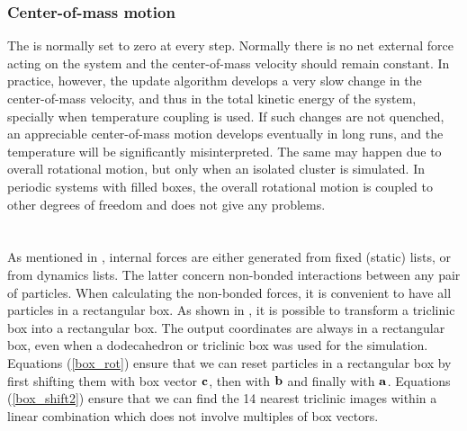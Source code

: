 \subsubsection*{Center-of-mass motion}
The  is normally set to zero at
every step.  Normally there is no net external force acting on the
system and the center-of-mass velocity should remain constant. In
practice, however, the update algorithm develops a very slow change in
the center-of-mass velocity, and thus in the total kinetic energy of
the system, specially when temperature coupling is used. If such
changes are not quenched, an appreciable center-of-mass motion
develops eventually in long runs, and the temperature will be
significantly misinterpreted. The same may happen due to overall
rotational motion, but only when an isolated cluster is simulated. In
periodic systems with filled boxes, the overall rotational motion is
coupled to other degrees of freedom and does not give any problems.


\section{}
\label{sec:ns}
As mentioned in , internal forces are
either generated from fixed (static) lists, or from dynamics lists.
The latter concern non-bonded interactions between any pair of particles.
When calculating the non-bonded forces, it is convenient to have all
particles in a rectangular box.
As shown in , it is possible to transform a
triclinic box into a rectangular box.
The output coordinates are always in a rectangular box, even when a
dodecahedron or triclinic box was used for the simulation.
Equations (\ref{box_rot}) ensure
that we can reset particles in a rectangular box by first shifting them with
box vector ${\bf c}$, then with ${\bf b}$ and finally with ${\bf a}$.
Equations (\ref{box_shift2}) ensure that we can find the 14 nearest 
triclinic images within a linear combination which does not involve
multiples of box vectors.

